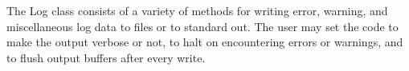 %


The Log class consists of a variety of methods for writing error, warning, and
miscellaneous log data to files or to standard out. 
The user may set
the code to make the output verbose or not,  to halt on encountering errors or warnings, and to flush output buffers
after every write.
